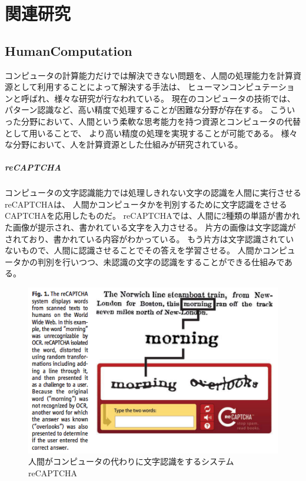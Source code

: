 \chapter{関連研究}\label{chap:related}

\section{HumanComputation}\label{humancomputation}

コンピュータの計算能力だけでは解決できない問題を、人間の処理能力を計算資源として利用することによって解決する手法は、
ヒューマンコンピュテーション\cite{humancomputation}と呼ばれ、様々な研究が行なわれている。
現在のコンピュータの技術では、パターン認識など、高い精度で処理することが困難な分野が存在する。
こういった分野において、人間という柔軟な思考能力を持つ資源とコンピュータの代替として用いることで、
より高い精度の処理を実現することが可能である。
様々な分野において、人を計算資源とした仕組みが研究されている。

\paragraph{reCAPTCHA}\label{recaptcha}

\mbox{}

コンピュータの文字認識能力では処理しきれない文字の認識を人間に実行させるreCAPTCHA\cite{recaptcha}は、
人間かコンピュータかを判別するために文字認識をさせるCAPTCHA\cite{captcha}を応用したものだ。
reCAPTCHAでは、人間に2種類の単語が書かれた画像が提示され、書かれている文字を入力させる。
片方の画像は文字認識がされており、書かれている内容がわかっている。
もう片方は文字認識されていないもので、人間に認識させることでその答えを学習させる。
人間かコンピュータかの判別を行いつつ、未認識の文字の認識をすることができる仕組みである。

\begin{figure}[htbp]
  \begin{center}
  \includegraphics[width=.5\linewidth,bb=0 0 476 316]{images/recaptcha.png}
  \end{center}
  \caption{人間がコンピュータの代わりに文字認識をするシステム reCAPTCHA}
  \label{fig:recaptcha}
\end{figure}

